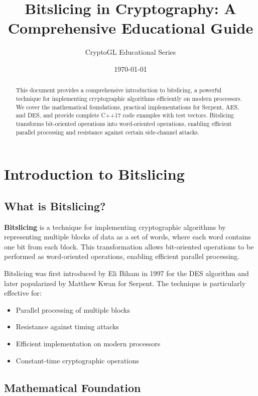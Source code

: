 \documentclass[11pt,a4paper]{article}
\title{\Huge\textbf{Bitslicing in Cryptography: A Comprehensive Educational Guide}}
\author{CryptoGL Educational Series}
\date{\today}
\begin{document}
\maketitle

\begin{abstract}
This document provides a comprehensive introduction to bitslicing, a powerful technique for implementing cryptographic algorithms efficiently on modern processors. We cover the mathematical foundations, practical implementations for Serpent, AES, and DES, and provide complete C++17 code examples with test vectors. Bitslicing transforms bit-oriented operations into word-oriented operations, enabling efficient parallel processing and resistance against certain side-channel attacks.
\end{abstract}

\tableofcontents
\newpage

\section{Introduction to Bitslicing}

\subsection{What is Bitslicing?}

\begin{definitionbox}
\textbf{Bitslicing} is a technique for implementing cryptographic algorithms by representing multiple blocks of data as a set of words, where each word contains one bit from each block. This transformation allows bit-oriented operations to be performed as word-oriented operations, enabling efficient parallel processing.
\end{definitionbox}

Bitslicing was first introduced by Eli Biham in 1997 for the DES algorithm and later popularized by Matthew Kwan for Serpent. The technique is particularly effective for:

\begin{itemize}
    \item Parallel processing of multiple blocks
    \item Resistance against timing attacks
    \item Efficient implementation on modern processors
    \item Constant-time cryptographic operations
\end{itemize}

\subsection{Mathematical Foundation}
\end{document}
